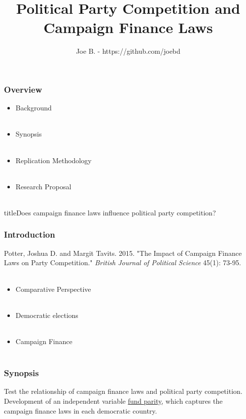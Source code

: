 \documentclass{beamer}
\title{Political Party Competition and Campaign Finance Laws}
\author{Joe B. - https://github.com/joebd}
\begin{document}

\begin{frame}
\maketitle
\end{frame}
	

\begin{frame}
	\frametitle{Overview}
	\begin{itemize} 
		\item{Background} \\~\
		\item{Synopsis} \\~\
		\item{Replication Methodology} \\~\
		\item{Research Proposal} \\~\   
	\end{itemize}
\end{frame}



\begin{frame}{title}{Does campaign finance laws influence political party competition?}
	\frametitle{Introduction} 
Potter, Joshua D. and Margit Tavits. 2015. "The Impact of Campaign Finance Laws on Party Competition." \emph{British Journal of Political Science} 45(1): 73-95. \\~\
\begin{itemize}
		\item{Comparative Perspective} \\~\
		\item{Democratic elections} \\~\
		\item{Campaign Finance} \\~\
\end{itemize}
\end{frame}


\begin{frame} 
	\frametitle{Synopsis}
Test the relationship of campaign finance laws and political party competition. \\
\vspace{1cm}
Development of an independent variable \underline{fund parity}, which captures the campaign finance laws in each democratic country.  
\end{frame}
\end{document}
